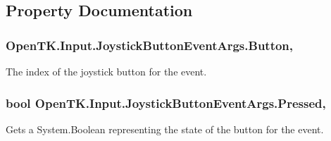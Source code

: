 \subsection{Property Documentation}
\hypertarget{class_open_t_k_1_1_input_1_1_joystick_button_event_args_a5984a4a8d487119f6e362661fc36c706}{
\subsubsection[{Button}]{ Open\-T\-K.\-Input.\-Joystick\-Button\-Event\-Args.\-Button\hspace{0.3cm}{\ttfamily [get]}, {\ttfamily [set]}}}\label{class_open_t_k_1_1_input_1_1_joystick_button_event_args_a5984a4a8d487119f6e362661fc36c706}


The index of the joystick button for the event. 

\hypertarget{class_open_t_k_1_1_input_1_1_joystick_button_event_args_a0bb2f495334c5e6e0f7a89e4354d6721}{
\subsubsection[{Pressed}]{\setlength{\rightskip}{0pt plus 5cm}bool Open\-T\-K.\-Input.\-Joystick\-Button\-Event\-Args.\-Pressed\hspace{0.3cm}{\ttfamily [get]}, {\ttfamily [set]}}}\label{class_open_t_k_1_1_input_1_1_joystick_button_event_args_a0bb2f495334c5e6e0f7a89e4354d6721}


Gets a System.\-Boolean representing the state of the button for the event. 


